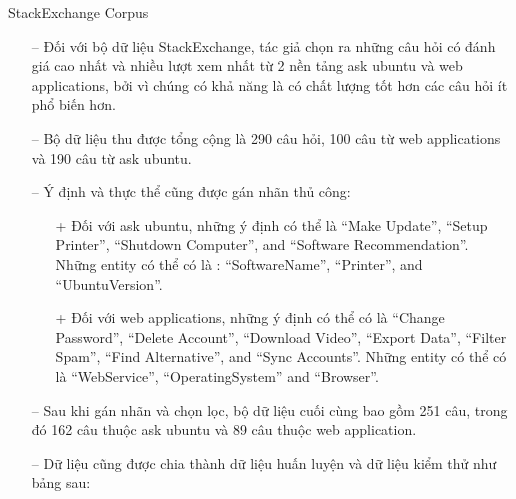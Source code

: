 StackExchange Corpus

\begin{itemize}
    \item[--] Đối với bộ dữ liệu StackExchange, tác giả chọn ra những câu hỏi có đánh giá cao nhất và nhiều lượt xem nhất từ 2 nền tảng ask ubuntu và web applications,  bởi vì chúng có khả năng là có chất lượng tốt hơn các câu hỏi ít phổ biến hơn.
        \item[--]Bộ dữ liệu thu được tổng cộng là 290 câu hỏi, 100 câu từ web applications và 190 câu từ ask ubuntu.
        \item[--]Ý định và thực thể cũng được gán nhãn thủ công:
        \begin{itemize}
            \item[+]Đối với ask ubuntu, những ý định có thể là “Make Update”, “Setup Printer”, “Shutdown Computer”, and “Software Recommendation”. Những entity có thể có là : “SoftwareName”, “Printer”, and “UbuntuVersion”.
            \item[+] Đối với web applications, những ý định có thể có là “Change Password”, “Delete Account”, “Download Video”, “Export Data”, “Filter Spam”, “Find Alternative”, and “Sync Accounts”. Những entity có thể có là “WebService”, “OperatingSystem” and “Browser”.
        \end{itemize}
    \item[--] Sau khi gán nhãn và chọn lọc, bộ dữ liệu cuối cùng bao gồm 251 câu, trong đó 162 câu thuộc ask ubuntu và 89 câu thuộc web application.
    \item[--] Dữ liệu cũng được chia thành dữ liệu huấn luyện và dữ liệu kiểm thử như bảng sau:
\end{itemize}


